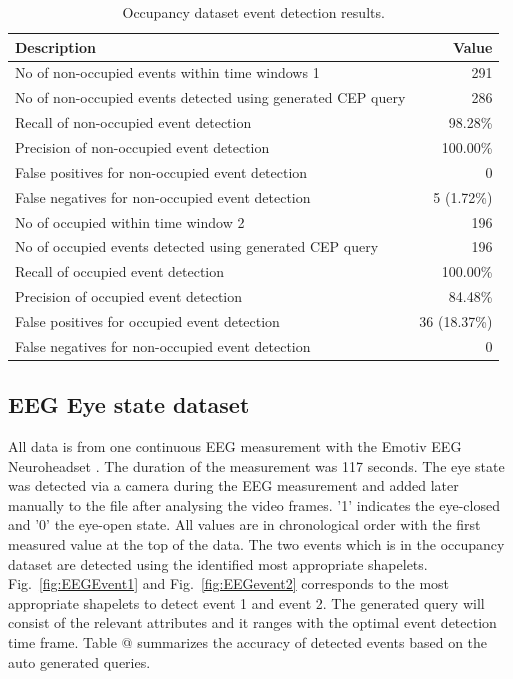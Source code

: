 \documentclass[conference]{IEEEtran}  %
\makeatletter
\newcommand*{\rom}[1]{\expandafter\@slowromancap\romannumeral #1@}
\makeatother
\begin{document}
\begin{table}
\centering
\caption{Occupancy dataset event detection results.}
\begin{tabular}{ | m{6cm} | m{2.3cm}| } 
 \hline 
\textbf{Description} & \multicolumn{1}{|r|}{\textbf{Value}}\\
\hline
No of non-occupied events within time windows 1 & \multicolumn{1}{|r|}{291}\\
\hline
No of non-occupied events detected using generated CEP query & \multicolumn{1}{|r|}{286}\\
\hline
Recall of non-occupied event detection & \multicolumn{1}{|r|}{98.28\%}\\
\hline
Precision of non-occupied event detection & \multicolumn{1}{|r|}{100.00\%}\\
\hline
False positives for non-occupied event detection & \multicolumn{1}{|r|}{0}\\
\hline
False negatives for non-occupied event detection & \multicolumn{1}{|r|}{5 (1.72\%)}\\
\hline
No of occupied within time window 2 & \multicolumn{1}{|r|}{196} \\
\hline
No of occupied events detected using generated CEP query & \multicolumn{1}{|r|}{196}\\ 
 \hline
Recall of occupied event detection & \multicolumn{1}{|r|}{100.00\%}\\
\hline
Precision of occupied event detection & \multicolumn{1}{|r|}{84.48\%}\\
\hline
False positives for occupied event detection & \multicolumn{1}{|r|}{36 (18.37\%)}\\
\hline
False negatives for non-occupied event detection & \multicolumn{1}{|r|}{0}\\
\hline

\end{tabular}
\end{table}


\subsection{EEG Eye state dataset}
All data is from one continuous EEG measurement with the Emotiv EEG Neuroheadset \cite{IEEEexample:EEG}. The duration of the measurement was 117 seconds. The eye state was detected via a camera during the EEG measurement and added later manually to the file after analysing the video frames. '1' indicates the eye-closed and '0' the eye-open state. All values are in chronological order with the first measured value at the top of the data. The two events which is in the occupancy dataset are detected using the identified most appropriate shapelets. Fig.~\ref{fig:EEGEvent1} and Fig.~\ref{fig:EEGevent2} corresponds to the most appropriate shapelets to detect event 1 and event 2. The generated query will consist of the relevant attributes and it ranges with the optimal event detection time frame. Table \rom{2} summarizes the accuracy of detected events based on the auto generated queries.
\end{document}
